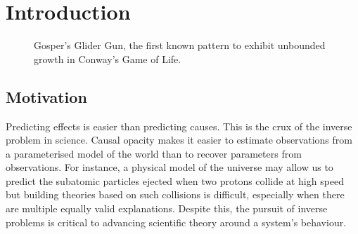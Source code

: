 \chapter{Introduction}


\begin{figure}[!h]
\centering
            \hfill
            \hfill
            \hfill
            \hfill
            \caption{Gosper's Glider Gun, the first known pattern to exhibit unbounded growth in Conway's Game of Life.\cite{hickerson}}
\label{fig:gospers-glider}
\end{figure}

\section{Motivation}
Predicting effects is easier than predicting causes. This is the crux of the inverse problem in science. Causal opacity makes it easier to estimate observations from a parameterised model of the world than to recover parameters from observations. For instance, a physical model of the universe may allow us to predict the subatomic particles ejected when two protons collide at high speed but building theories based on such collisions is difficult, especially when there are multiple equally valid explanations. Despite this, the pursuit of inverse problems is critical to advancing scientific theory around a system's behaviour.\\

